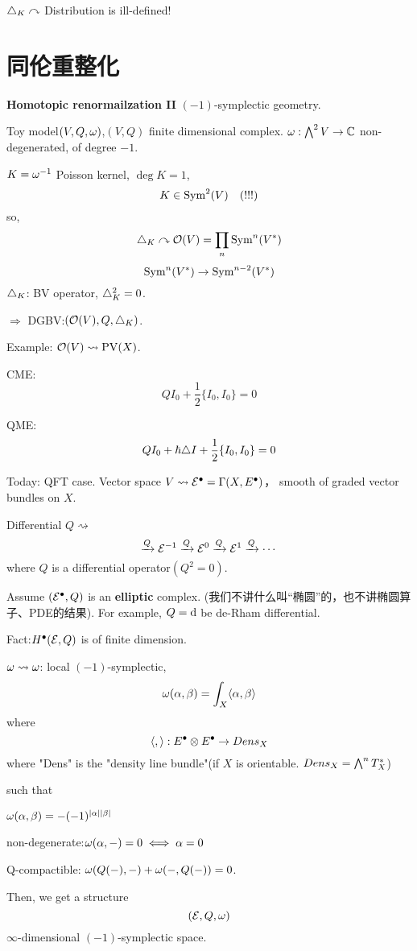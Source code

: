 $\triangle_K\curvearrowright$ Distribution is ill-defined!


\section{同伦重整化}
\textbf{Homotopic renormailzation II}
$(-1)$-symplectic geometry.

Toy model$(V,Q,\omega)$,$(V,Q)$ finite dimensional complex.
$\omega:\bigwedge\nolimits^{2}V\to\mathbb{C}$
non-degenerated, of degree $-1$.

$K=\omega^{-1}$ Poisson kernel, $\deg K=1$,
$$K\in\operatorname{Sym}^2(V)\quad (!!!)$$
so,
$$\triangle_K\curvearrowright\mathcal{O}(V)=\prod_{n}\operatorname{Sym}^n(V^*)$$
$$\operatorname{Sym}^n(V^*)\to\operatorname{Sym}^{n-2}(V^*)$$
$\triangle_K$: BV operator, $\triangle_K^2=0$.

$\Rightarrow$ DGBV:$(\mathcal{O}(V),Q,\triangle_K)$.

Example: $\mathcal{O}(V)\rightsquigarrow\operatorname{PV}(X)$.

CME:
$$QI_0+\frac{1}{2}\{I_0,I_0\}=0$$

QME:
$$QI_0+\hbar\triangle I+\frac{1}{2}\{I_0,I_0\}=0$$

Today: QFT case.
Vector space $V\rightsquigarrow\mathcal{E}^{\bullet}=\Gamma(X,E^{\bullet})$，
smooth of graded vector bundles on $X$.

Differential $Q\rightsquigarrow$
$$\xrightarrow{Q}\mathcal{E}^{-1}\xrightarrow{Q}\mathcal{E}^{0}\xrightarrow{Q}\mathcal{E}^{1}\xrightarrow{Q}\cdots$$
where $Q$ is a differential operator$(Q^2=0)$.

Assume $(\mathcal{E}^{\bullet},Q)$ is an \textbf{elliptic} complex.
(我们不讲什么叫“椭圆”的，也不讲椭圆算子、PDE的结果).
For example, $Q=\mathrm{d}$ be de-Rham differential.

Fact:$H^{\bullet}(\mathcal{E},Q)$ is of finite dimension.

$\omega\rightsquigarrow\omega$: local $(-1)$-symplectic,
$$\omega(\alpha,\beta)=\int_X\langle\alpha,\beta\rangle$$
where
$$\langle,\rangle: E^{\bullet}\otimes E^{\bullet}\to Dens_X$$
where "Dens" is the "density line bundle"(if $X$ is orientable. $Dens_X=\bigwedge\nolimits^{n}T_X^*$)

such that

$\omega(\alpha,\beta)=-(-1)^{|\alpha||\beta|}$

non-degenerate:$\omega(\alpha,-)=0\iff\alpha=0$

Q-compactible:
$\omega(Q(-),-)+\omega(-,Q(-))=0$.

Then, we get a structure
$$(\mathcal{E},Q,\omega)$$
$\infty$-dimensional $(-1)$-symplectic space.

